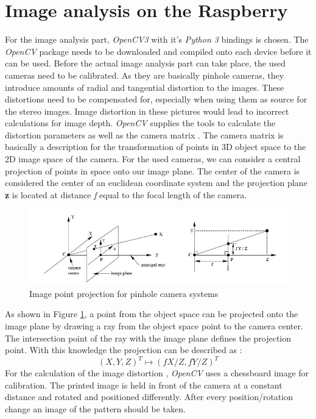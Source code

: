 \section{Image analysis on the Raspberry}
For the image analysis part, \textit{OpenCV3} with it's \textit{Python 3} bindings is chosen. The \textit{OpenCV} package needs to be downloaded and compiled onto each device before it can be used.
Before the actual image analysis part can take place, the used cameras need to be calibrated. As they are basically pinhole cameras, they introduce amounts of radial and tangential distortion to the images. These distortions need to be compensated for, especially when using them as source for the stereo images. Image distortion in these pictures would lead to incorrect calculations for image depth.
\textit{OpenCV} supplies the tools to calculate the distortion parameters as well as the camera matrix \cite{OpenCV.2018}.
The camera matrix is basically a description for the transformation of points in 3D object space to the 2D image space of the camera. For the used cameras, we can consider a central projection of points in space onto our image plane. The center of the camera is considered the center of an euclidean coordinate system and the projection plane \textbf{z} is located at distance \textit{f} equal to the focal length of the camera.
\begin{figure}[H]
\includegraphics[width=\textwidth]{images/pionhole.JPG}
\caption{Image point projection for pinhole camera systems \cite{Hartley.2000}}
\label{pinholecamera_mapping} 
\end{figure}
As shown in Figure \ref{pinholecamera_mapping}, a point from the object space can be projected onto the image plane by drawing a ray from the object space point to the camera center. The intersection point of the ray with the image plane defines the projection point. With this knowledge the projection can be described as :
\begin{equation}
(X,Y,Z)^{T} \mapsto (fX/Z,fY/Z)^{T}
\end{equation}
For the calculation of the image distortion , \textit{OpenCV} uses a chessboard image for calibration. The printed image is held in front of the camera at a constant distance and rotated and positioned differently. After every position/rotation change an image of the pattern should be taken.
